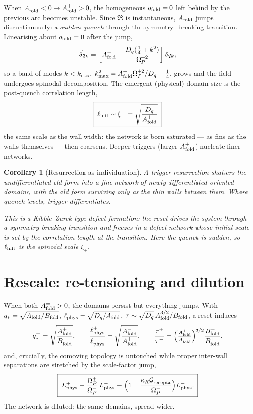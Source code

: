 \documentclass[11pt,a4paper,oneside]{book}
\newcommand{\Op}{\Omega_P}
\newcommand{\Grec}{\mathcal G_{\rm recepta}}
\newcommand{\note}[1]{\textcolor{black!65}{\emph{#1}}}
\newcommand{\reset}{\mathfrak{R}}
\newcommand{\qf}{q_{\rm fold}}
\newcommand{\Af}{A_{\rm fold}}
\newcommand{\Bf}{B_{\rm fold}}
\newcommand{\Dq}{D_q}
\theoremstyle{plain}
\newtheorem{corollary}{Corollary}[chapter]
\theoremstyle{definition}
\theoremstyle{remark}
\begin{document}
When $\Af^-<0\to\Af^+>0$, the homogeneous $\qf=0$ left behind by the previous arc becomes unstable. Since
$\reset$ is instantaneous, $\Af$ jumps discontinuously: a \emph{sudden quench} through the symmetry-
breaking transition. Linearising about $\qf=0$ after the jump,
\begin{equation}
\dot{\delta q}_k=\left[\Af^+-\frac{\Dq(\tfrac14+k^2)}{\Op^{+2}}\right]\delta q_k,
\end{equation}
so a band of modes $k<k_{\max}$, $k_{\max}^2=\Af^+\Op^{+2}/\Dq-\tfrac14$, grows and the field undergoes
spinodal decomposition. The emergent (physical) domain size is the post-quench correlation length,
\begin{equation}
\boxed{\;\ell_{\rm init}\sim\xi_+=\sqrt{\frac{\Dq}{\Af^+}}\;}
\end{equation}
the same scale as the wall width: the network is born saturated --- as fine as the walls themselves ---
then coarsens. Deeper triggers (larger $\Af^+$) nucleate finer networks.

\begin{corollary}[Resurrection as individuation]\label{resurrectionetwork:cor:individ}
A trigger-resurrection shatters the undifferentiated old form into a fine network of newly differentiated
oriented domains, with the old form surviving only as the thin walls between them. Where quench levels,
trigger differentiates.
\end{corollary}

\note{This is a Kibble--Zurek-type defect formation: the reset drives the system through a
symmetry-breaking transition and freezes in a defect network whose initial scale is set by the
correlation length at the transition. Here the quench is sudden, so $\ell_{\rm init}$ is the spinodal
scale $\xi_+$.}

\section{Rescale: re-tensioning and dilution}

When both $\Af^\pm>0$, the domains persist but everything jumps. With $q_\ast=\sqrt{\Af/\Bf}$,
$\ell_{\rm phys}=\sqrt{\Dq/\Af}$, $\tau\sim\sqrt{\Dq}\,\Af^{3/2}/\Bf$, a reset induces
\begin{equation}
q_\ast^{+}=\sqrt{\frac{\Af^+}{\Bf^+}},\qquad
\frac{\ell_{\rm phys}^+}{\ell_{\rm phys}^-}=\sqrt{\frac{\Af^-}{\Af^+}},\qquad
\frac{\tau^+}{\tau^-}=\Bigl(\tfrac{\Af^+}{\Af^-}\Bigr)^{3/2}\frac{\Bf^-}{\Bf^+},
\end{equation}
and, crucially, the comoving topology is untouched while proper inter-wall separations are stretched by
the scale-factor jump,
\begin{equation}
\boxed{\;L_{\rm phys}^{+}=\frac{\Op^+}{\Op^-}\,L_{\rm phys}^{-}=\Bigl(1+\frac{\kappa_R\Grec^-}{\Op^-}\Bigr)L_{\rm phys}^{-}.\;}
\end{equation}
The network is diluted: the same domains, spread wider.
\end{document}
